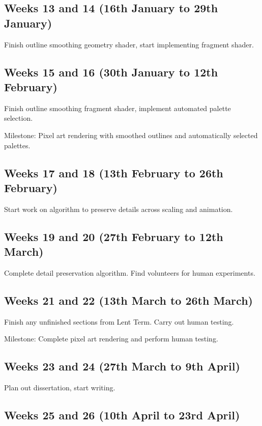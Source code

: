 \documentclass[12pt]{article}
\begin{document}
\subsection*{Weeks 13 and 14 (16th January to 29th January)}

Finish outline smoothing geometry shader, start implementing fragment shader.

\subsection*{Weeks 15 and 16 (30th January to 12th February)}

Finish outline smoothing fragment shader, implement automated palette selection.

Milestone: Pixel art rendering with smoothed outlines and automatically selected palettes.

\subsection*{Weeks 17 and 18 (13th February to 26th February)}

Start work on algorithm to preserve details across scaling and animation.

\subsection*{Weeks 19 and 20 (27th February to 12th March)}

Complete detail preservation algorithm. Find volunteers for human experiments.

\subsection*{Weeks 21 and 22 (13th March to 26th March)}

Finish any unfinished sections from Lent Term. Carry out human testing.

Milestone: Complete pixel art rendering and perform human testing.

\subsection*{Weeks 23 and 24 (27th March to 9th April)}

Plan out dissertation, start writing.

\subsection*{Weeks 25 and 26 (10th April to 23rd April)}
\end{document}
